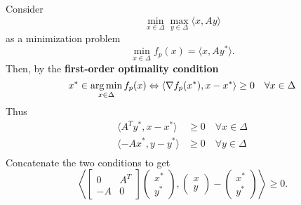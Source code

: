 \documentclass[aspectratio=149]{beamer}
\begin{document}
\begin{frame}
  \frametitle{}
  Consider
  \begin{equation}
      \min_{x \in \Delta} \max_{y \in \Delta} \langle x, Ay \rangle
  \end{equation}
  as a minimization problem
  \begin{equation}
      \min_{x \in \Delta}  f_p(x) = \langle x, A y^* \rangle .
  \end{equation}
  Then, by the \textbf{first-order optimality condition}
  \begin{equation}
    x^* \in \operatorname*{arg\,min}_{x \in \Delta} f_p(x)  \Leftrightarrow \langle \nabla f_p(x^*), x-x^* \rangle \ge 0 \quad \forall x \in \Delta
  \end{equation}
  Thus
  \begin{equation}
    \begin{aligned}
      \langle A^T y^*, x-x^* \rangle &\ge 0 \quad \forall  x \in \Delta \\
      \langle -A x^*, y-y^* \rangle &\ge 0 \quad \forall  y \in \Delta \\
    \end{aligned}
  \end{equation}
  Concatenate the two conditions to get
  \begin{equation}
  \left\langle \begin{bmatrix}
      0 & A^T \\
      -A & 0
    \end{bmatrix}
    \left(\begin{array}{c}
      x^*\\ y^*
    \end{array}  \right),
    \left(\begin{array}{c}
      x \\ y
    \end{array}  \right)
    -
    \left(\begin{array}{c}
      x^* \\
      y^*
    \end{array} \right)
 \right\rangle \ge 0.
  \end{equation}
\end{frame}
\end{document}
